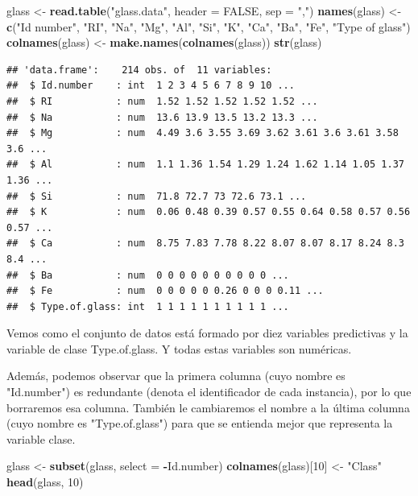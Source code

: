 \documentclass[]{article}
\newenvironment{Shaded}{\begin{snugshade}}{\end{snugshade}}
\newcommand{\DataTypeTok}[1]{\textcolor[rgb]{0.13,0.29,0.53}{#1}}
\newcommand{\DecValTok}[1]{\textcolor[rgb]{0.00,0.00,0.81}{#1}}
\newcommand{\KeywordTok}[1]{\textcolor[rgb]{0.13,0.29,0.53}{\textbf{#1}}}
\newcommand{\NormalTok}[1]{#1}
\newcommand{\OperatorTok}[1]{\textcolor[rgb]{0.81,0.36,0.00}{\textbf{#1}}}
\newcommand{\OtherTok}[1]{\textcolor[rgb]{0.56,0.35,0.01}{#1}}
\newcommand{\StringTok}[1]{\textcolor[rgb]{0.31,0.60,0.02}{#1}}
\begin{document}
\begin{Shaded}
\begin{Highlighting}[]
\NormalTok{glass <-}\StringTok{ }\KeywordTok{read.table}\NormalTok{(}\StringTok{"glass.data"}\NormalTok{, }\DataTypeTok{header =} \OtherTok{FALSE}\NormalTok{, }\DataTypeTok{sep =} \StringTok{","}\NormalTok{)}
\KeywordTok{names}\NormalTok{(glass) <-}\StringTok{ }\KeywordTok{c}\NormalTok{(}\StringTok{"Id number"}\NormalTok{, }\StringTok{"RI"}\NormalTok{, }\StringTok{"Na"}\NormalTok{, }\StringTok{"Mg"}\NormalTok{, }\StringTok{"Al"}\NormalTok{, }\StringTok{"Si"}\NormalTok{, }\StringTok{"K"}\NormalTok{, }\StringTok{"Ca"}\NormalTok{, }\StringTok{"Ba"}\NormalTok{, }\StringTok{"Fe"}\NormalTok{, }
		\StringTok{"Type of glass"}\NormalTok{)}
\KeywordTok{colnames}\NormalTok{(glass) <-}\StringTok{ }\KeywordTok{make.names}\NormalTok{(}\KeywordTok{colnames}\NormalTok{(glass))}
\KeywordTok{str}\NormalTok{(glass)}
\end{Highlighting}
\end{Shaded}

\newpage

\begin{verbatim}
## 'data.frame':    214 obs. of  11 variables:
##  $ Id.number    : int  1 2 3 4 5 6 7 8 9 10 ...
##  $ RI           : num  1.52 1.52 1.52 1.52 1.52 ...
##  $ Na           : num  13.6 13.9 13.5 13.2 13.3 ...
##  $ Mg           : num  4.49 3.6 3.55 3.69 3.62 3.61 3.6 3.61 3.58 3.6 ...
##  $ Al           : num  1.1 1.36 1.54 1.29 1.24 1.62 1.14 1.05 1.37 1.36 ...
##  $ Si           : num  71.8 72.7 73 72.6 73.1 ...
##  $ K            : num  0.06 0.48 0.39 0.57 0.55 0.64 0.58 0.57 0.56 0.57 ...
##  $ Ca           : num  8.75 7.83 7.78 8.22 8.07 8.07 8.17 8.24 8.3 8.4 ...
##  $ Ba           : num  0 0 0 0 0 0 0 0 0 0 ...
##  $ Fe           : num  0 0 0 0 0 0.26 0 0 0 0.11 ...
##  $ Type.of.glass: int  1 1 1 1 1 1 1 1 1 1 ...
\end{verbatim}

Vemos como el conjunto de datos está formado por diez variables predictivas y la variable de clase Type.of.glass. Y todas estas variables son numéricas.

Además, podemos observar que la primera columna (cuyo nombre es "Id.number") es redundante (denota el identificador de cada
instancia), por lo que borraremos esa columna. También le cambiaremos el nombre a la última columna (cuyo nombre es "Type.of.glass") para que se entienda mejor que representa la variable clase.

\begin{Shaded}
\begin{Highlighting}[]
\NormalTok{glass <-}\StringTok{ }\KeywordTok{subset}\NormalTok{(glass, }\DataTypeTok{select =} \OperatorTok{-}\NormalTok{Id.number)}
\KeywordTok{colnames}\NormalTok{(glass)[}\DecValTok{10}\NormalTok{] <-}\StringTok{ "Class"}
\KeywordTok{head}\NormalTok{(glass, }\DecValTok{10}\NormalTok{)}
\end{Highlighting}
\end{Shaded}
\end{document}
